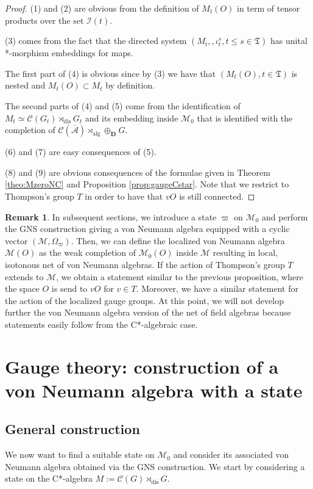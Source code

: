 \documentclass[a4paper,12pt]{amsart}
\numberwithin{equation}{section}
\theoremstyle{definition}
\newtheorem{remark}[theo]{Remark}
\newcommand{\oscrA}{{\overline{\mathscr{A}}}}
\DeclareMathOperator{\alg}{alg}
\newcommand{\scrC}{\mathscr C}
\newcommand{\D}{\mathbf D}
\DeclareMathOperator{\dis}{dis}
\newcommand{\cI}{\mathcal I}
\newcommand{\scrM}{\mathscr M}
\newcommand{\fT}{\mathfrak T}
\begin{document}
\begin{proof}
(1) and (2) are obvious from the definition of $M_t(O)$ in term of tensor products over the set $\cI(t).$

(3) comes from the fact that the directed system $(M_t,,\iota_t^s , t\leq s \in\fT)$ has unital *-morphism embeddings for maps.

The first part of (4) is obvious since by (3) we have that $(M_t(O), t\in \fT)$ is nested and $M_t(O)\subset M_t$ by definition.

The second parts of (4) and (5) come from the identification of $M_t\simeq\scrC(G_t)\rtimes_{\dis} G_t$ and its embedding inside $\scrM_0$ that is identified with the completion of $\scrC(\oscrA)\rtimes_{\alg} \oplus_\D G$.

(6) and (7) are easy consequences of (5).

(8) and (9) are obvious consequences of the formulae given in Theorem \ref{theo:MzeroNC} and Proposition \ref{prop:gaugeCstar}.
Note that we restrict to Thompson's group $T$ in order to have that $vO$ is still connected.
\end{proof}

\begin{remark}In subsequent sections, we introduce a state $\varpi$ on $\scrM_0$ and perform the GNS construction giving a von Neumann algebra equipped with a cyclic vector $(\scrM,\Omega_{\varpi})$.
Then, we can define the localized von Neumann algebra $\scrM(O)$ as the weak completion of $\scrM_0(O)$ inside $\scrM$ resulting in local, isotonous net of von Neumann algebras.
If the action of Thompson's group $T$ extends to $\scrM$, we obtain a statement similar to the previous proposition, where the space $O$ is send to $vO$ for $v\in T$. Moreover, we have a similar statement for the action of the localized gauge groups.
At this point, we will not develop further the von Neumann algebra version of the net of field algebras because statements easily follow from the C*-algebraic case.\end{remark}

\section{Gauge theory: construction of a von Neumann algebra with a state}\label{sec:VNA}

\subsection{General construction}
We now want to find a suitable state on $\scrM_0$ and consider its associated von Neumann algebra obtained via the GNS construction.
We start by considering a state on the C*-algebra $M:=\scrC(G)\rtimes_{\dis} G$.
\end{document}
